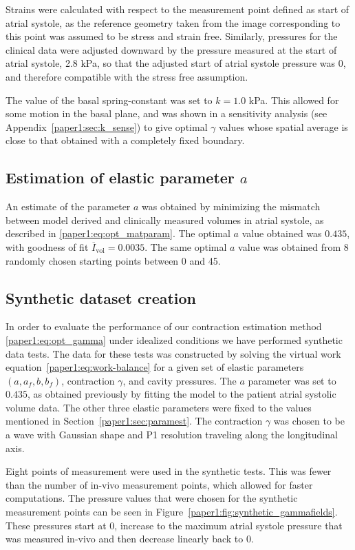 Strains were calculated with respect to the measurement point defined
as start of atrial systole, as the reference geometry taken from the
image corresponding to this point was assumed to be stress and strain
free. Similarly, pressures for the clinical data were adjusted
downward by the pressure measured at the start of atrial systole, 2.8
kPa, so that the adjusted start of atrial systole pressure was 0, and
therefore compatible with the stress free assumption.

The value of the basal spring-constant was set to $k = 1.0$ kPa. This allowed for some
motion in the basal plane,
and was shown in a sensitivity analysis (see Appendix~\ref{paper1:sec:k_sense})
to give optimal $\gamma$ values
whose spatial average is close to that obtained with a completely fixed boundary.

\subsection{Estimation of elastic parameter $a$}
\label{paper1:sec:elasticparam}
An estimate of the parameter $a$ was obtained by minimizing the mismatch between
model derived and clinically measured volumes in atrial systole,
as described in \eqref{paper1:eq:opt_matparam}. The optimal $a$ value obtained was $0.435$, 
with goodness of fit $\overline{I}_{\text{vol}} = 0.0035$.
The same optimal $a$ value was obtained from 8 randomly chosen starting points
between 0 and 45.


\subsection{Synthetic dataset creation}

\label{paper1:sec:data_synthetic}
In order to evaluate the performance of our contraction estimation
method \eqref{paper1:eq:opt_gamma} under idealized conditions we  
have performed synthetic data tests. The data for these tests was
constructed by solving the virtual work 
equation~\eqref{paper1:eq:work-balance} for a given set of elastic parameters
 $(a, a_f, b, b_f)$, contraction $\gamma$, and cavity pressures.
The $a$ parameter was set to $0.435$, as obtained previously by
fitting the model to the patient atrial systolic volume data. The
other three elastic parameters were fixed to the values mentioned in Section~\ref{paper1:sec:paramest}.
The contraction $\gamma$ was chosen to be a wave 
with Gaussian shape and P1 resolution traveling along the longitudinal axis.

Eight points of measurement were used in the synthetic tests. This was
fewer than the number of in-vivo  
measurement points, which allowed for faster computations. The
pressure values that were chosen  
for the synthetic measurement points
can be seen in Figure~\ref{paper1:fig:synthetic_gammafields}. These pressures start at 0, 
increase to the maximum atrial systole pressure 
that was measured in-vivo and then decrease linearly back to 0. 


